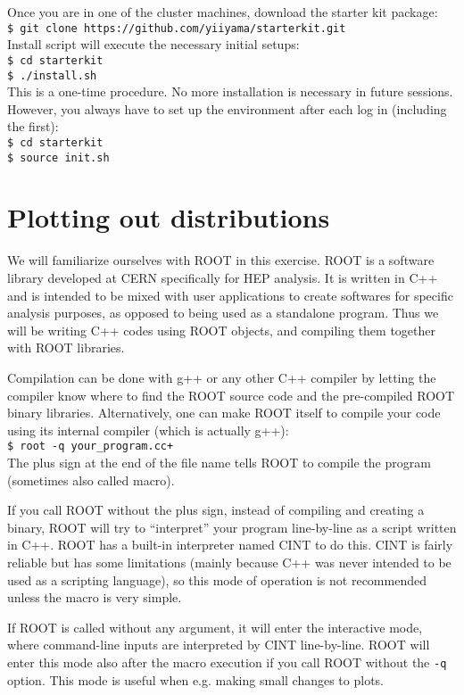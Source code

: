 \documentclass[12pt]{article}
\newcommand{\terminal}[1]{\vspace{3pt}\texttt{\$ #1} \\}
\begin{document}
Once you are in one of the cluster machines, download the starter kit package: \\
\terminal{git clone https://github.com/yiiyama/starterkit.git}
Install script will execute the necessary initial setups: \\
\terminal{cd starterkit}
\terminal{./install.sh}
This is a one-time procedure. No more installation is necessary in future sessions. However, you always have to set up the environment after each log in (including the first): \\
\terminal{cd starterkit}
\terminal{source init.sh}

\setcounter{section}{0}

\section{Plotting out distributions}
We will familiarize ourselves with ROOT in this exercise. ROOT is a software library developed at CERN specifically for HEP analysis. It is written in C++ and is intended to be mixed with user applications to create softwares for specific analysis purposes, as opposed to being used as a standalone program. Thus we will be writing C++ codes using ROOT objects, and compiling them together with ROOT libraries.

Compilation can be done with g++ or any other C++ compiler by letting the compiler know where to find the ROOT source code and the pre-compiled ROOT binary libraries. Alternatively, one can make ROOT itself to compile your code using its internal compiler (which is actually g++): \\
\terminal{root -q your\_program.cc+}
The plus sign at the end of the file name tells ROOT to compile the program (sometimes also called macro).

If you call ROOT without the plus sign, instead of compiling and creating a binary, ROOT will try to ``interpret'' your program line-by-line as a script written in C++. ROOT has a built-in interpreter named CINT to do this. CINT is fairly reliable but has some limitations (mainly because C++ was never intended to be used as a scripting language), so this mode of operation is not recommended unless the macro is very simple.

If ROOT is called without any argument, it will enter the interactive mode, where command-line inputs are interpreted by CINT line-by-line. ROOT will enter this mode also after the macro execution if you call ROOT without the \texttt{-q} option. This mode is useful when e.g. making small changes to plots.
\end{document}
